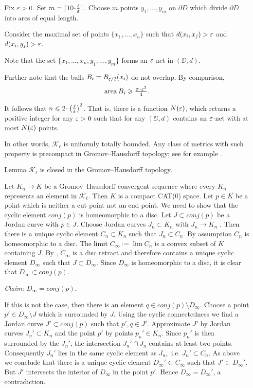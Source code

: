 \documentclass[a4paper,10pt]{amsart}
\begin{document}
Fix $\varepsilon>0$. 
Set $m=\lceil 10\cdot\tfrac\ell\eps\rceil$.
Choose $m$ points $y_1,\dots,y_m$ on $\partial D$
which divide $\partial D$ into arcs of equal length.

Consider the maximal set of points $\{x_1,\dots,x_n\}$ such that $d(x_i,x_j)>\varepsilon$ and $d(x_i,y_j)>\varepsilon$.

Note that the set $\{x_1,\dots,x_n,y_1,\dots,y_m\}$
forms an $\varepsilon$-net in $(\DD,d)$.

Further note that the balls $B_i=B_{\varepsilon/2}(x_i)$
do not overlap.
By comparison,
\[\area B_i\ge \tfrac{\pi\cdot\eps^2}{4}.\]

It follows that $n\le 2\cdot\left(\tfrac\ell\eps\right)^2$.
That is, there is a function $N(\varepsilon)$,
which returns a positive integer for any $\varepsilon>0$
such that for any 
$(\DD,d)$ contains an $\varepsilon$-net
with at most $N(\varepsilon)$ points.

In other words, $\mathcal{K}_\ell$ is uniformly totally bounded.
Any class of metrics with such property is precompact in Gromov--Hausdorff topology; 
see for example \cite[7.4.15]{BBI}.
\qeds





\begin{thm}{Lemma}
$\mathcal{K}_\ell$ is closed in the Gromov--Hausdorff topology.
\end{thm}
Let $K_n\to K$ be a Gromov--Hausdorff convergent sequence  where every $K_n$ represents an element in  $\mathcal{K}_\ell$. Then
$K$ is a compact CAT(0) space. Let $p\in K$ be a point which is neither a cut point not an end point. We need to show that the cyclic 
element $conj(p)$ is homeomorphic to a disc. Let $J\subset conj(p)$ be a Jordan curve with $p\in J$. Choose Jordan curves $J_n\subset K_n$
with $J_n\to K_n$ \cite[2.2]{W1}. Then there is a unique cyclic element $C_n\subset K_n$ such that $J_n\subset C_n$. By assumption $C_n$ is homeomorphic
to a disc. The limit $C_\infty:=\lim C_n$ is a convex subset of $K$ containing $J$. By \cite[6.3]{W1}, $C_\infty$ is a disc retract and therefore contains a
unique cyclic element $D_\infty$ such that $J\subset D_\infty$. Since $D_\infty$ is homeomorphic to a disc, it is clear that $D_\infty\subset conj(p)$.

{\it Claim:} $D_\infty=conj(p)$.

\noindent If this is not the case, then there is an element $q\in conj(p)\setminus D_\infty$. Choose a point $p'\in D_\infty\setminus J$ which is surrounded 
by $J$. Using the cyclic connectedness we find a Jordan curve $J'\subset conj(p)$ such that $p',q\in J'$. Approximate $J'$
by Jordan curves $J_n'\subset K_n$ and the point $p'$ by points $p_n'\in K_n$. Since $p_n'$ is then surrounded by the $J_n'$, the intersection
$J_n'\cap J_n$ contains at least two points. Consequently $J_n'$ lies in the same cyclic element as $J_n$,\ i.e. $J_n'\subset C_n$. As
above we conclude that there is a unique cyclic element $D_\infty'\subset C_\infty$ such that $J'\subset D_\infty'$. But 
$J'$ intersects the interior of $D_\infty$ in the point $p'$. Hence $D_\infty=D_\infty'$, a contradiction.
\qeds
\end{document}
